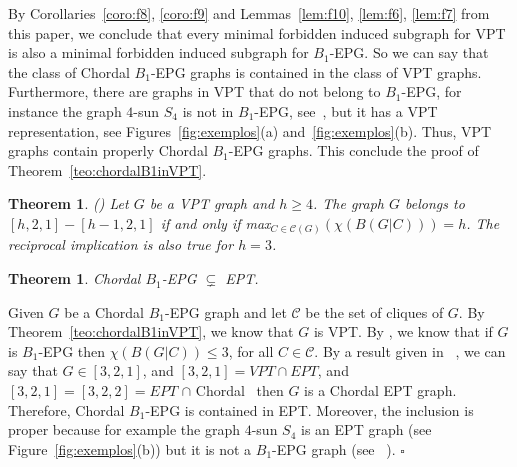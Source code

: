 \documentclass[9pt]{entcs}
\newtheorem{teo}[thm]{Theorem}%
\begin{document}

By Corollaries~\ref{coro:f8}, \ref{coro:f9} and Lemmas~\ref{lem:f10}, \ref{lem:f6}, \ref{lem:f7} from this paper, we conclude that every minimal forbidden induced subgraph for VPT is also a minimal forbidden induced subgraph for $B_1$-EPG. So we can say that the class of Chordal $B_1$-EPG graphs is contained in the class of VPT graphs. Furthermore, there are graphs in VPT that do not belong to $B_1$-EPG, for instance the graph $4$-sun $S_4$ is not in $B_1$-EPG, see~\cite{golumbic2009}, but it has a VPT representation, see Figures~\ref{fig:exemplos}(a) and~\ref{fig:exemplos}(b). Thus, VPT graphs contain properly Chordal $B_1$-EPG graphs. This conclude the proof of Theorem~\ref{teo:chordalB1inVPT}.



\begin{teo}
(\cite{alcon2014recognizing}) Let $G$ be a VPT graph and $h\geq 4$. The graph $G$ belongs to $[h,2,1]-[h-1,2,1]$ if and only if max$_{C\in\mathcal{C}(G)}(\chi (B(G|C)))=h$. The reciprocal implication is also true for $h=3$.
\end{teo}


\begin{teo}\label{teo:b1epgept}
Chordal $B_1$-EPG $\subsetneq$ EPT. 
\end{teo}

\begin{pf}
Given $G$ be a  Chordal $B_1$-EPG graph and let  $\mathcal{C}$  be the set of cliques of $G$. By Theorem~\ref{teo:chordalB1inVPT}, we know that $G$ is VPT. By \cite{golumbic2009}, we know that if $G$ is $B_1$-EPG then $\chi (B(G|C))\leq 3$,  for all $C \in \mathcal{C}$. By a result given in ~\cite{alcon2014recognizing}, we can say that $G \in [3,2,1]$, and $[3,2,1] = VPT \cap EPT$, and $[3,2,1] = [3,2,2] = EPT$ $\cap$ Chordal~\cite{golumbic1985} then $G$ is a Chordal EPT graph. Therefore, Chordal $B_1$-EPG is contained in EPT. Moreover, the inclusion is proper because for example the graph $4$-sun $S_4$ is an EPT graph (see Figure~\ref{fig:exemplos}(b)) but it is not a $B_1$-EPG graph (see ~\cite{golumbic2009}).
 $\square$\end{pf} 
\end{document}
